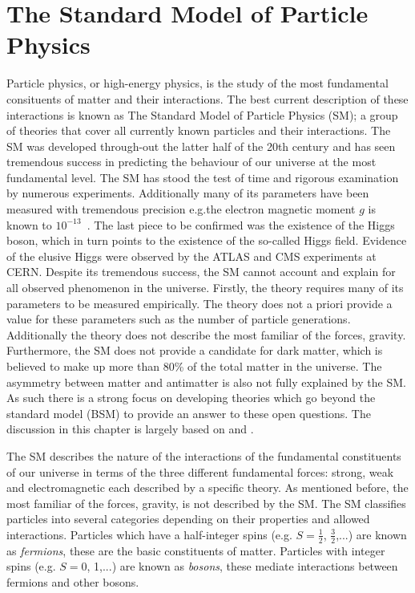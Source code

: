 \chapter{The Standard Model of Particle Physics} \label{sec:the_standard_model_of_particle_physics}
Particle physics, or high-energy physics, is the study of the most fundamental consituents of matter and their interactions. The best current description of these interactions is known as The Standard Model of Particle Physics (SM); a group of theories that cover all currently known particles and their interactions. The SM was developed through-out the latter half of the 20th century and has seen tremendous success in predicting the behaviour of our universe at the most fundamental level. The SM has stood the test of time and rigorous examination by numerous experiments. Additionally many of its parameters have been measured with tremendous precision e.g.the electron magnetic moment $g$ is known to $10^{-13}$~\cite{Theory:AwesomeSM}. The last piece to be confirmed was the existence of the Higgs boson, which in turn points to the existence of the so-called Higgs field. Evidence of the elusive Higgs were observed by the ATLAS and CMS experiments at CERN\cite{Theory:HiggsDiscoveryATLAS,Theory:HiggsDiscoveryCMS}.
Despite its tremendous success, the SM cannot account and explain for all observed phenomenon in the universe. Firstly, the theory requires many of its parameters to be measured empirically. The theory does not a priori provide a value for these parameters such as the number of particle generations. Additionally the theory does not describe the most familiar of the forces, gravity. Furthermore, the SM does not provide a candidate for dark matter, which is believed to make up more than 80\% of the total matter in the universe. The asymmetry between matter and antimatter is also not fully explained by the SM. As such there is a strong focus on developing theories which go beyond the standard model (BSM) to provide an answer to these open questions. The discussion in this chapter is largely based on \cite{Theory:Perkins} and \cite{Theory:IntroGriffiths}.

The SM describes the nature of the interactions of the fundamental constituents of our universe in terms of the three different fundamental forces: strong, weak and electromagnetic each described by a specific theory. As mentioned before, the most familiar of the forces, gravity, is not described by the SM. The SM classifies particles into several categories depending on their properties and allowed interactions. Particles which have a half-integer spins (e.g. $S=\frac{1}{2}$, $\frac{3}{2}$,...) are known as \textit{fermions}, these are the basic constituents of matter. Particles with integer spins (e.g. $S=$0, 1,...) are known as \textit{bosons}, these mediate interactions between fermions and other bosons.

